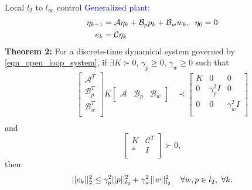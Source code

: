 \begin{frame}{Local $l_2$ to $l_{\infty}$ control}
\textcolor{blue}{Generalized plant:}
\begin{equation}\label{eqn_open_loop_system}
\begin{split}
\eta_{k+1}&=\mathcal{A}\eta_k+\mathcal{B}_pp_k+\mathcal{B}_ww_k, \hspace{0.2cm}\eta_0=0\\
e_k &=\mathcal{C}\eta_k 
\end{split}
\end{equation}	
\pause
\textbf{Theorem 2:}
	For a discrete-time dynamical system governed by \eqref{eqn_open_loop_system}, 
	if $\exists K\succ0$, $\gamma_p \geq0$, $\gamma_w\geq0$ such that 
	\begin{equation} \label{eqn_LMI_Dissipativity1}
	\begin{split}	
	\hspace{1cm}
	\begin{bmatrix}
	\mathcal{A}^T\\
	\mathcal{B}_p^T\\
	\mathcal{B}_w^T\\
	\end{bmatrix}
	K
	\begin{bmatrix}
	\mathcal{A} & \mathcal{B}_p & \mathcal{B}_w
	\end{bmatrix}
	&\prec
	\begin{bmatrix}
	K & 0 & 0\\
	0 & \gamma_p^2 I&0\\
	0 & 0 &\gamma_w^2 I\\
	\end{bmatrix}\\
	\end{split}
	\end{equation}
	and
	\begin{equation}\label{eqn_LMI_output_bound1}
	\begin{bmatrix}
	K & \mathcal{C}^T \\
	* & I \\
	\end{bmatrix}\succ0, 
	\end{equation}
	then
	\begin{equation*}
	||e_k||_2^2\leq  \gamma_p^2||p||_{l_2}^2+\gamma_w^2||w||_{l_2}^2  \hspace{0.4cm} \forall w,p \in l_2,\ \forall k.
	\end{equation*}
\end{frame}
